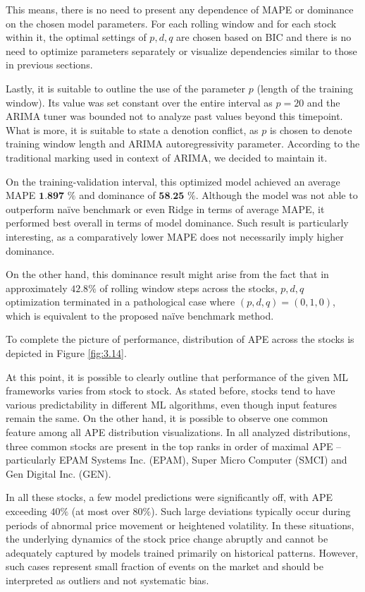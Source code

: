 This means, there is no need to present any dependence of MAPE or dominance on the chosen model
parameters. For each rolling window and for each
stock within it, the optimal settings of $p,d,q$ are chosen based on BIC and there is no need to optimize
parameters separately or visualize dependencies similar to those in previous sections.

Lastly, it is suitable to outline the use of the parameter $p$ (length of the training window). Its value was set constant over the entire interval as $p = 20$ and the ARIMA tuner was bounded not to analyze past values beyond this timepoint.
What is more, it is suitable to state a denotion conflict, as $p$ is chosen to denote training window length and ARIMA autoregressivity parameter. According to the traditional marking used in
context of ARIMA, we decided to maintain it.    

On the training-validation interval, this optimized model achieved an average MAPE $\textbf{1.897 \%}$ and dominance of $\textbf{58.25 \%}$.
Although the model was not able to outperform naïve benchmark or even Ridge in terms of average MAPE, it performed best overall in terms of model dominance.
Such result is particularly interesting, as a comparatively lower MAPE does not necessarily imply higher dominance.

On the other hand, this dominance result might arise from the fact that in approximately $42.8 \%$ of rolling window steps across the stocks, $p, d, q$ optimization terminated in a pathological case where $(p, d, q) = (0, 1, 0)$, which is equivalent to the proposed naïve benchmark method.

To complete the picture of performance, distribution of APE across the stocks is depicted in Figure \ref{fig:3.14}.
\newline
\par
At this point, it is possible to clearly outline that performance of the given ML frameworks varies from stock to stock. As stated before, stocks tend to have various predictability in different ML algorithms, even though input features remain the same. On the other hand, it is possible to observe one common feature among all APE distribution visualizations.
In all analyzed distributions, three common stocks are present in the top ranks in order of maximal APE – particularly EPAM Systems Inc. (EPAM), Super Micro Computer (SMCI) and Gen Digital Inc. (GEN).

In all these stocks, a few model predictions were significantly off, with APE exceeding $40 \%$ (at most over $80 \%$).
Such large deviations typically occur during periods of abnormal price movement or heightened volatility. In these situations, the underlying dynamics of the stock price change abruptly and cannot be adequately captured by models trained primarily on historical patterns.
However, such cases represent small fraction of events on the market and should be interpreted as outliers and not systematic bias.

